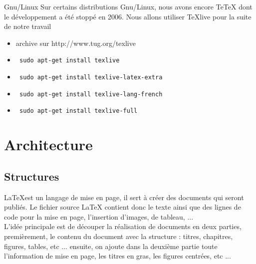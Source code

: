 \documentclass[12pt]{beamer}
\begin{document}
  \begin{frame}
    \begin{block}{Gnu/Linux}
      Sur certains distributions Gnu/Linux, nous avons encore Te\TeX{} dont le développement a été 
      stoppé en 2006. Nous allons utiliser \TeX live pour la suite de notre travail 
    \end{block}

    \begin{block}{}
      \begin{itemize}
	\item<2-> archive sur http://www.tug.org/texlive
	\item<3-> \verb? sudo apt-get install texlive? 
	\item<4-> \verb? sudo apt-get install texlive-latex-extra?
	\item<5-> \verb? sudo apt-get install texlive-lang-french?
	\item<6-> \verb? sudo apt-get install texlive-full?
      \end{itemize}
    \end{block}
  \end{frame}     

  
\section{Architecture}

\subsection{Structures}
  \begin{frame}
    \begin{block}{}
     \LaTeX est un langage de mise en page, il sert à créer des documents qui seront publiés. 
     Le fichier source LaTeX contient donc le texte ainsi que des lignes de code pour la mise 
     en page, l'insertion d'images, de tableau, ... \\
     L'idée principale est de découper la réalisation de documents en deux parties, premièrement,
     le contenu du document avec la structure : titres, chapitres, figures, tables, etc ... ensuite, 
     on ajoute dans la deuxième partie toute l'information de mise en page, les titres en gras, les 
     figures centrées, etc ...
    \end{block}
  \end{frame}
\end{document}
